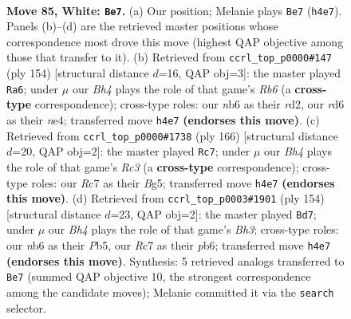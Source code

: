 \documentclass[11pt]{article}
\begin{document}
\clearpage

\begin{figure}[p]\centering
\begin{subfigure}{0.46\textwidth}\centering
\resizebox{\linewidth}{!}{%
\newchessgame
\chessboard[
  setfen={7k/2R5/1n1r4/8/p4P1B/P6P/6K1/8 w - - 25 85},
  showmover=false,
  pgfstyle=straightmove, color=movearrow, markmove={h4-e7}
]}
\caption{}
\end{subfigure}\hfill
\begin{subfigure}{0.46\textwidth}\centering
\resizebox{\linewidth}{!}{%
\newchessgame
\chessboard[
  setfen={8/4k3/1R6/4B3/2P1n1P1/8/p2r4/6K1 w - - 0 78},
  showmover=false,
  pgfstyle=straightmove, color=movearrow, markmove={b6-a6}
]}
\caption{}
\end{subfigure}
\\[4pt]
\begin{subfigure}{0.46\textwidth}\centering
\resizebox{\linewidth}{!}{%
\newchessgame
\chessboard[
  setfen={8/1n5p/1r6/3pk1B1/8/2R4P/4K3/8 w - - 0 84},
  showmover=false,
  pgfstyle=straightmove, color=movearrow, markmove={c3-c7}
]}
\caption{}
\end{subfigure}\hfill
\begin{subfigure}{0.46\textwidth}\centering
\resizebox{\linewidth}{!}{%
\newchessgame
\chessboard[
  setfen={8/8/1p1n1k2/1P2p3/1K6/5P1B/7P/8 w - - 1 78},
  showmover=false,
  pgfstyle=straightmove, color=movearrow, markmove={h3-d7}
]}
\caption{}
\end{subfigure}
\caption{\textbf{Move 85, White: \texttt{Be7}.} (a) Our position; Melanie plays \texttt{Be7} (\texttt{h4e7}). Panels (b)--(d) are the retrieved master positions whose correspondence most drove this move (highest QAP objective among those that transfer to it). (b) Retrieved from \texttt{ccrl\_top\_p0000\#147} (ply 154) [structural distance $d$=16, QAP obj=3]: the master played \texttt{Ra6}; under $\mu$ our \emph{Bh4} plays the role of that game's \emph{Rb6} (a \textbf{cross-type} correspondence); cross-type roles: our \emph{n}b6 as their \emph{r}d2, our \emph{r}d6 as their \emph{n}e4; transferred move \texttt{h4e7} \textbf{(endorses this move)}. (c) Retrieved from \texttt{ccrl\_top\_p0000\#1738} (ply 166) [structural distance $d$=20, QAP obj=2]: the master played \texttt{Rc7}; under $\mu$ our \emph{Bh4} plays the role of that game's \emph{Rc3} (a \textbf{cross-type} correspondence); cross-type roles: our \emph{R}c7 as their \emph{B}g5; transferred move \texttt{h4e7} \textbf{(endorses this move)}. (d) Retrieved from \texttt{ccrl\_top\_p0003\#1901} (ply 154) [structural distance $d$=23, QAP obj=2]: the master played \texttt{Bd7}; under $\mu$ our \emph{Bh4} plays the role of that game's \emph{Bh3}; cross-type roles: our \emph{n}b6 as their \emph{P}b5, our \emph{R}c7 as their \emph{p}b6; transferred move \texttt{h4e7} \textbf{(endorses this move)}. Synthesis: 5 retrieved analogs transferred to \texttt{Be7} (summed QAP objective 10, the strongest correspondence among the candidate moves); Melanie committed it via the \texttt{search} selector.}
\label{fig:thought-m168}
\end{figure}
\end{document}
